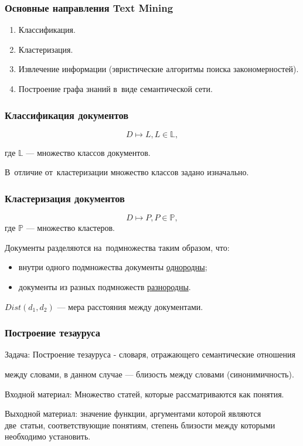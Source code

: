 \documentclass{beamer}
\begin{document}
\begin{frame}
\frametitle{Основные направления Text Mining}
\begin{enumerate}
\item{Классификация.}
\item{Кластеризация.}
\item{Извлечение информации (эвристические алгоритмы поиска закономерностей).}
\item{Построение графа знаний в~виде семантической сети.}

\end{enumerate}
\end{frame}

\begin{frame}
\frametitle{Классификация документов}
$$D \mapsto L, L \in \mathbb{L},$$

где $\mathbb{L}$ --- множество классов документов.

\vspace{1cm}

В~отличие от~кластеризации множество классов задано изначально.
\end{frame}

\begin{frame}
\frametitle{Кластеризация документов}
$$D \mapsto P, P \in \mathbb{P},$$
где $\mathbb{P}$ --- множество кластеров.

\vspace{1cm}

Документы разделяются на~подмножества таким образом, что:

\begin{itemize}
\item{внутри одного подмножества документы \underline{однородны};}
\item{документы из разных подмножеств \underline{разнородны}.}
\end{itemize}

$Dist(d_{1},d_{2})$ --- мера расстояния между документами.
\end{frame}

\begin {frame}
\frametitle{Построение тезауруса}
Задача: Построение тезауруса - словаря, отражающего семантические отношения

между словами, в данном случае --- близость между словами (синонимичность).

Входной материал: Множество статей, которые рассматриваются как понятия.

Выходной материал: значение функции, аргументами которой являются две~статьи, 
соответствующие понятиям, степень близости между которыми необходимо установить.
\end{frame}
\end{document}
